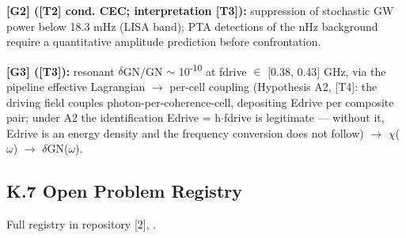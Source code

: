 \documentclass[11pt,letterpaper]{article}
\begin{document}
\noindent \textbf{[G2] ([T2] cond. CEC; interpretation [T3]): }suppression of stochastic GW power below 18.3 mHz (LISA band); PTA detections of the nHz background require a quantitative amplitude prediction before confrontation.

\noindent \textbf{[G3] ([T3]): }resonant $\delta$GN/GN $\sim$ 10\textsuperscript{-10} at fdrive $\in$ [0.38, 0.43] GHz, via the pipeline effective Lagrangian $\to$ per-cell coupling (Hypothesis A2, [T4]: the driving field couples photon-per-coherence-cell, depositing Edrive per composite pair; under A2 the identification Edrive = h$\cdot$fdrive is legitimate --- without it, Edrive is an energy density and the frequency conversion does not follow) $\to$ $\chi$($\omega$) $\to$ $\delta$GN($\omega$).

\subsection*{K.7  Open Problem Registry}

\noindent Full registry in repository [2], .
\end{document}

